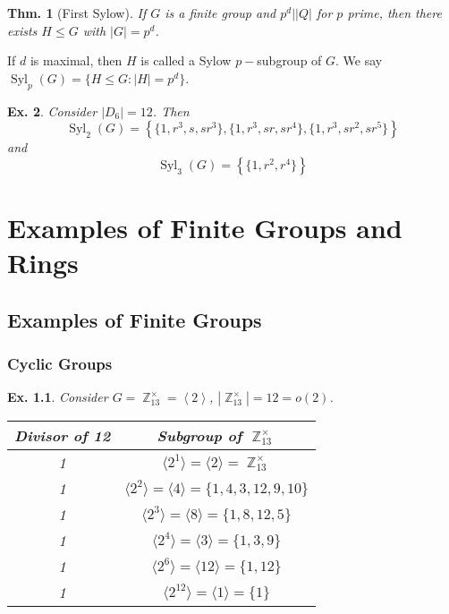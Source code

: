 \documentclass[12pt, a4paper]{book}
\DeclareMathOperator{\Z}{\mathbb{Z}}
\newtheorem{theorem}{Thm.}[section]
\newtheorem{example}[theorem]{Ex.}
\theoremstyle{nonumberplain}
\begin{document}
\begin{theorem}[First Sylow]
    If $G$ is a finite group and $p^d||Q|$ for $p$ prime, then there exists $H\leq G$ with $|G|=p^d$.
\end{theorem}
If $d$ is maximal, then $H$ is called a Sylow $p-$subgroup of $G$.
We say $\operatorname{Syl}_p(G)=\{H\leq G:|H|=p^d\}$.
\begin{example}
    Consider $|D_6|=12$.
    Then
    \[\operatorname{Syl}_2(G)=\left\{\{1,r^3,s,sr^3\},\{1,r^3,sr,sr^4\},\{1,r^3,sr^2,sr^5\}\right\}\]
    and
    \[\operatorname{Syl}_3(G)=\left\{\{1,r^2,r^4\}\right\}\]
\end{example}
\chapter{Examples of Finite Groups and Rings}
\section{Examples of Finite Groups}
\subsection{Cyclic Groups}
\begin{example}
    Consider $G=\Z_{13}^\times=\left\langle 2\right\rangle$, $|\Z_{13}^\times|=12=o(2)$.
    \begin{center}
        \begin{tabular}{c|c}
            Divisor of 12&Subgroup of $\Z_{13}^\times$\\
            \hline
            1& $\langle 2^1\rangle=\langle 2\rangle=\Z_{13}^\times$\\
            1& $\langle 2^2\rangle=\langle 4\rangle=\{1,4,3,12,9,10\}$\\
            1& $\langle 2^3\rangle=\langle 8\rangle=\{1,8,12,5\}$\\
            1& $\langle 2^4\rangle=\langle 3\rangle=\{1,3,9\}$\\
            1& $\langle 2^6\rangle=\langle 12\rangle=\{1,12\}$\\
            1& $\langle 2^{12}\rangle=\langle 1\rangle =\{1\}$
        \end{tabular}
    \end{center}
\end{example}
\end{document}
